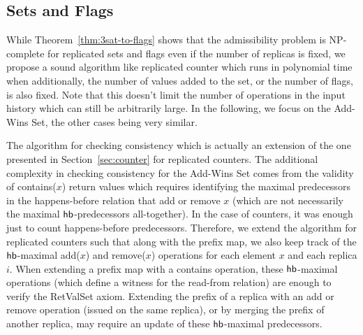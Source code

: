 
\subsection{Sets and Flags}
\label{sec:ptime:sets}

While Theorem~\ref{thm:3sat-to-flags} shows that the admissibility problem is NP-complete for replicated sets and flags even if the number of replicas is fixed, we propose a sound algorithm like replicated counter which runs in polynomial time when additionally, the number of values added to the set, or the number of flags, is also fixed. Note that this doesn't limit the number of operations in the input history which can still be arbitrarily large. In the following, we focus on the Add-Wins Set, the other cases being very similar.

The algorithm for checking consistency which is actually an extension of the one presented in Section~\ref{sec:counter} for replicated counters.
The additional complexity in checking consistency for the Add-Wins Set comes from the validity of {\sf contains}($x$) return values which requires identifying the maximal predecessors in the happens-before relation that add or remove $x$ (which are not necessarily the maximal $\textsf{hb}$-predecessors all-together). In the case of counters, it was enough just to count happens-before predecessors.
Therefore, we extend the algorithm for replicated counters such that along with the prefix map, we also keep track of the $\textsf{hb}$-maximal {\sf add}($x$) and {\sf remove}($x$) operations for each element $x$ and each replica $i$.
When extending a prefix map with a {\sf contains} operation, these $\textsf{hb}$-maximal operations (which define a witness for the read-from relation) are enough to verify the {\sc RetValSet} axiom. Extending the prefix of a replica with an {\sf add} or {\sf remove} operation (issued on the same replica), or by merging the prefix of another replica, may require an update of these $\textsf{hb}$-maximal predecessors.


